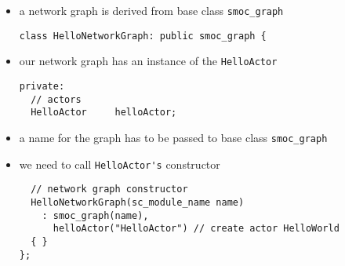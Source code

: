 \begin{frame}[fragile=singleslide]
\begin{itemize}
\item a network graph is derived from base class \lstinline!smoc_graph!
\begin{lstlisting}
class HelloNetworkGraph: public smoc_graph {
\end{lstlisting}
\item our network graph has an instance of the \lstinline!HelloActor!
\begin{lstlisting}
private:
  // actors
  HelloActor     helloActor;
\end{lstlisting}
\item a name for the graph has to be passed to base class \lstinline!smoc_graph!
\item we need to call \lstinline!HelloActor's! constructor
\begin{lstlisting}
  // network graph constructor
  HelloNetworkGraph(sc_module_name name)
    : smoc_graph(name),
      helloActor("HelloActor") // create actor HelloWorld
  { }
};
\end{lstlisting}
\end{itemize}
\end{frame}

